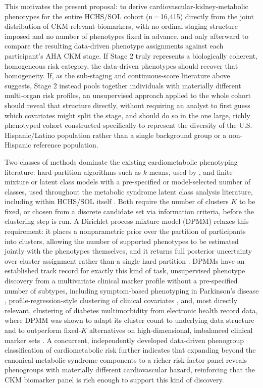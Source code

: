 \documentclass[11pt]{article}
\begin{document}
This motivates the present proposal: to derive cardiovascular-kidney-metabolic phenotypes for the entire HCHS/SOL cohort (n\,=\,16,415) directly from the joint distribution of CKM-relevant biomarkers, with no ordinal staging structure imposed and no number of phenotypes fixed in advance, and only afterward to compare the resulting data-driven phenotype assignments against each participant's AHA CKM stage. If Stage 2 truly represents a biologically coherent, homogeneous risk category, the data-driven phenotypes should recover that homogeneity. If, as the sub-staging and continuous-score literature above suggests, Stage 2 instead pools together individuals with materially different multi-organ risk profiles, an unsupervised approach applied to the whole cohort should reveal that structure directly, without requiring an analyst to first guess which covariates might split the stage, and should do so in the one large, richly phenotyped cohort constructed specifically to represent the diversity of the U.S. Hispanic/Latino population rather than a single background group or a non-Hispanic reference population.

Two classes of methods dominate the existing cardiometabolic phenotyping literature: hard-partition algorithms such as $k$-means, used by \citet{yang2025datadriven}, and finite mixture or latent class models with a pre-specified or model-selected number of classes, used throughout the metabolic syndrome latent class analysis literature, including within HCHS/SOL itself \citep{arguelles2015characterization,riahi2018patterns}. Both require the number of clusters $K$ to be fixed, or chosen from a discrete candidate set via information criteria, before the clustering step is run. A Dirichlet process mixture model (DPMM) relaxes this requirement: it places a nonparametric prior over the partition of participants into clusters, allowing the number of supported phenotypes to be estimated jointly with the phenotypes themselves, and it returns full posterior uncertainty over cluster assignment rather than a single hard partition \citep{dahl2006modelbased}. DPMMs have an established track record for exactly this kind of task, unsupervised phenotype discovery from a multivariate clinical marker profile without a pre-specified number of subtypes, including symptom-based phenotyping in Parkinson's disease \citep{white2012dirichlet}, profile-regression-style clustering of clinical covariates \citep{liverani2013premium}, and, most directly relevant, clustering of diabetes multimorbidity from electronic health record data, where DPMM was shown to adapt its cluster count to underlying data structure and to outperform fixed-$K$ alternatives on high-dimensional, imbalanced clinical marker sets \citep{kita2025enhancing}. A concurrent, independently developed data-driven phenogroup classification of cardiometabolic risk \citep{feng2026phenogroups} further indicates that expanding beyond the canonical metabolic syndrome components to a richer risk-factor panel reveals phenogroups with materially different cardiovascular hazard, reinforcing that the CKM biomarker panel is rich enough to support this kind of discovery.
\end{document}

